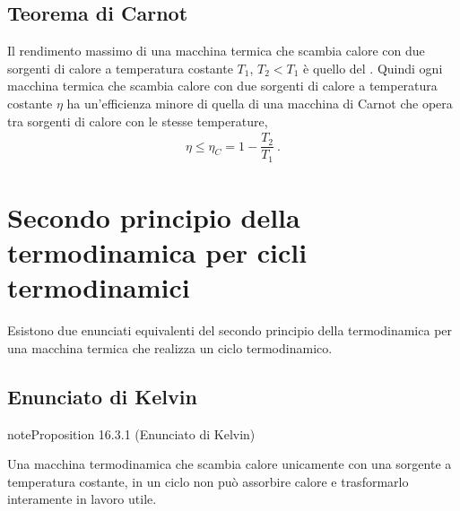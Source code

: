 \documentclass[letterpaper,10pt,italian]{jupyterBook}
\begin{document}
\subsection{Teorema di Carnot}
\label{\detokenize{ch/thermodynamics/heat-engine-carnot:teorema-di-carnot}}\label{\detokenize{ch/thermodynamics/heat-engine-carnot:physics-hs-thermodynamics-heat-engine-carnot-td-cycle-theorem}}
\sphinxAtStartPar
Il rendimento massimo di una macchina termica che scambia calore con due sorgenti di calore a temperatura costante \(T_1\), \(T_2 < T_1\) è quello del {\hyperref[\detokenize{ch/thermodynamics/heat-engine-carnot:physics-hs-thermodynamics-heat-engine-carnot-td-cycle}]{}}. Quindi ogni macchina termica che scambia calore con due sorgenti di calore a temperatura costante \(\eta\) ha un’efficienza minore di quella di una macchina di Carnot che opera tra sorgenti di calore con le stesse temperature,
\begin{equation*}
\begin{split}\eta \le \eta_C = 1 - \dfrac{T_2}{T_1} \ .\end{split}
\end{equation*}
\sphinxstepscope


\section{Secondo principio della termodinamica per cicli termodinamici}
\label{\detokenize{ch/thermodynamics/heat-engine-second-principle:secondo-principio-della-termodinamica-per-cicli-termodinamici}}\label{\detokenize{ch/thermodynamics/heat-engine-second-principle:physics-hs-thermodynamics-heat-engine-second-principle}}\label{\detokenize{ch/thermodynamics/heat-engine-second-principle::doc}}
\sphinxAtStartPar
Esistono due enunciati equivalenti del secondo principio della termodinamica per una macchina termica che realizza un ciclo termodinamico.


\subsection{Enunciato di Kelvin}
\label{\detokenize{ch/thermodynamics/heat-engine-second-principle:enunciato-di-kelvin}}\label{\detokenize{ch/thermodynamics/heat-engine-second-principle:physics-hs-thermodynamics-heat-engine-second-principle-kelvin}}\label{ch/thermodynamics/heat-engine-second-principle:proposition-0}
\begin{sphinxadmonition}{note}{Proposition 16.3.1 (Enunciato di Kelvin)}



\sphinxAtStartPar
Una macchina termodinamica che scambia calore unicamente con una sorgente a temperatura costante, in un ciclo non può assorbire calore e trasformarlo interamente in lavoro utile.
\end{sphinxadmonition}
\end{document}
